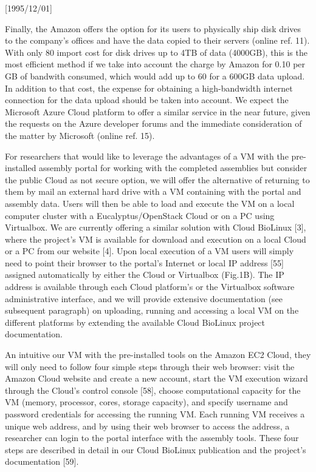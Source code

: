 \NeedsTeXFormat{LaTeX2e}[1995/12/01] \documentclass[10pt]{bmc_article}
\newenvironment{bmcformat}{\begin{raggedright}\baselineskip20pt\sloppy\setboolean{publ}{false}}{\end{raggedright}\baselineskip20pt\sloppy}
\begin{document}
\begin{bmcformat}
Finally, the Amazon offers the option for its users to physically ship disk drives to the company's offices
and have the data copied to their servers (online ref. 11). With only 80 import cost for disk drives up to 4TB
of data (4000GB), this is the most efficient method if we take into account the charge by Amazon for 0.10 per
GB of bandwith consumed, which would add up to 60 for a 600GB data upload. In addition to that cost, the
expense for obtaining a high-bandwidth internet connection for the data upload should be taken into account.
We expect the Microsoft Azure Cloud platform to offer a similar service in the near future, given the requests
on the Azure developer forums and the immediate consideration of the matter by Microsoft (online ref. 15).

For researchers that would like to leverage the advantages of a VM with the pre-installed assembly portal for
working with the completed assemblies but consider the public Cloud as not secure option, we will offer the
alternative of returning to them by mail an external hard drive with a VM containing with the portal and
assembly data. Users will then be able to load and execute the VM on a local computer cluster with a
Eucalyptus/OpenStack Cloud or on a PC using Virtualbox. We are currently offering a similar solution with
Cloud BioLinux [3], where the project's VM is available for download and execution on a local Cloud or a PC
from our website [4].  Upon local execution of a VM users will simply need to point their browser to the
portal's Internet or local IP address [55] assigned automatically by either the Cloud or Virtualbox (Fig.1B).
The IP address is available through each Cloud platform's or the Virtualbox software administrative
interface, and we will provide extensive documentation (see subsequent paragraph) on uploading, running and
accessing a local VM on the different platforms by extending the available Cloud BioLinux project
documentation.

An intuitive \cite{youtube}
our VM with the pre-installed tools on the Amazon EC2 Cloud, they will only need to follow four simple steps
through their web browser: visit the Amazon Cloud website and create a new account, start the VM execution
wizard through the Cloud's control console [58], choose computational capacity for the VM (memory,
processor, cores, storage capacity), and specify username and password credentials for accessing the running
VM. Each running VM receives a unique web address, and by using their web browser to access the address, a
researcher can login to the portal interface with the assembly tools. These four steps are described in detail
in our Cloud BioLinux publication and the project's documentation [59].


\end{bmcformat}
\end{document}
